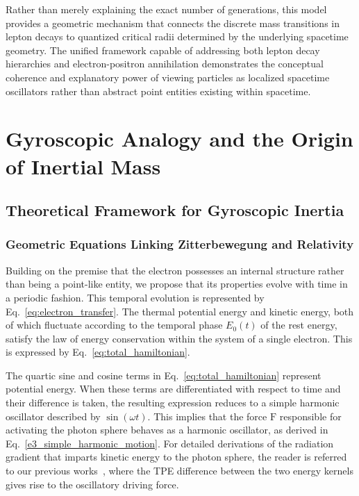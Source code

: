 \documentclass[%
 reprint,
 amsmath,amssymb,
 aps,
]{revtex4-1}
\numberwithin{equation}{section}%
\begin{document}
Rather than merely explaining the exact number of generations, this model provides a geometric mechanism that connects the discrete mass transitions in lepton decays to quantized critical radii determined by the underlying spacetime geometry. The unified framework capable of addressing both lepton decay hierarchies and electron-positron annihilation demonstrates the conceptual coherence and explanatory power of viewing particles as localized spacetime oscillators rather than abstract point entities existing within spacetime.


\section{Gyroscopic Analogy and the Origin of Inertial Mass}

\subsection{Theoretical Framework for Gyroscopic Inertia}

\subsubsection{Geometric Equations Linking Zitterbewegung and Relativity}

Building on the premise that the electron possesses an internal structure rather than being a point-like entity, we propose that its properties evolve with time in a periodic fashion. This temporal evolution is represented by Eq.~\eqref{eq:electron_transfer}. The thermal potential energy and kinetic energy, both of which fluctuate according to the temporal phase $E_{0}(t)$ of the rest energy, satisfy the law of energy conservation within the system of a single electron. This is expressed by Eq.~\eqref{eq:total_hamiltonian}.

The quartic sine and cosine terms in Eq.~\eqref{eq:total_hamiltonian} represent potential energy. When these terms are differentiated with respect to time and their difference is taken, the resulting expression reduces to a simple harmonic oscillator described by $\sin(\omega t)$. This implies that the force $\bm{\mathrm{F}}$ responsible for activating the photon sphere behaves as a harmonic oscillator, as derived in Eq.~\eqref{e3_simple_harmonic_motion}. For detailed derivations of the radiation gradient that imparts kinetic energy to the photon sphere, the reader is referred to our previous works~\cite{hanamura2018, hanamura2024}, where the TPE difference between the two energy kernels gives rise to the oscillatory driving force.
\end{document}
